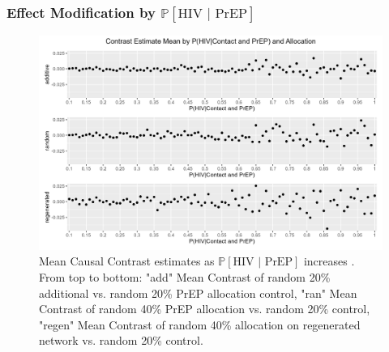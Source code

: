 \documentclass{article}
\theoremstyle{definition}
\begin{document}
\subsubsection{Effect Modification by $\mathbb{P}\left[\text{HIV } \vert \text{ PrEP}\right]$}
\begin{figure}[H]
    \centering
    \includegraphics[scale=0.75]{Figures/p2 Mean plots.png}
    \caption{Mean Causal Contrast estimates as $\mathbb{P}\left[\text{HIV } \vert \text{ PrEP}\right]$ increases . From top to bottom: "add" Mean Contrast of random 20\% additional vs. random 20\% PrEP allocation control, "ran" Mean Contrast of random 40\% PrEP allocation vs. random 20\% control, "regen" Mean Contrast of random 40\% allocation on regenerated network vs. random 20\% control.}
    \label{fig:Figure 15}
\end{figure}
\end{document}
